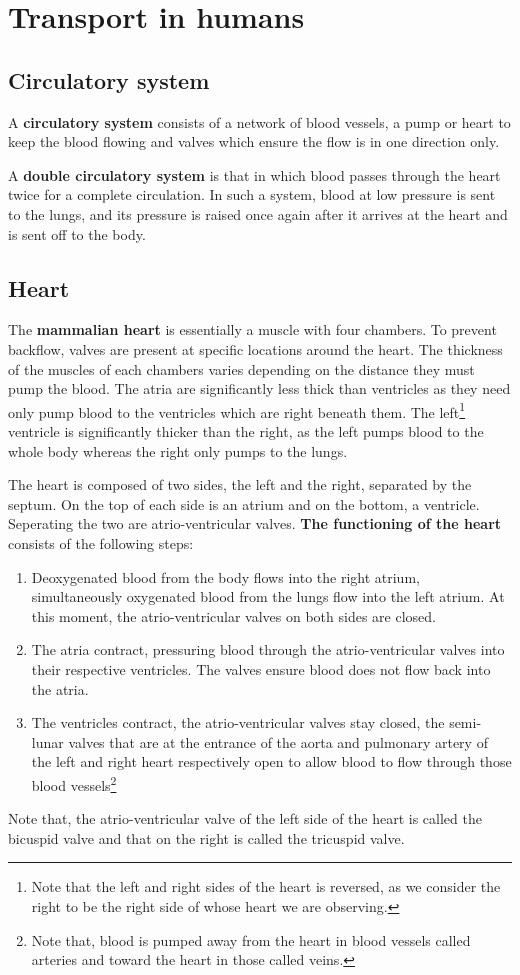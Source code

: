 \section{Transport in humans}
\subsection{Circulatory system}

A \textbf{circulatory system} consists of a network of blood vessels, a pump or heart to keep the
blood flowing and valves which ensure the flow is in one direction only.

A \textbf{double circulatory system} is that in which blood passes through the heart twice for
a complete circulation. In such a system, blood at low pressure is sent to the lungs, and its
pressure is raised once again after it arrives at the heart and is sent off to the body.

\subsection{Heart}
The \textbf{mammalian heart} is essentially a muscle with four chambers. To prevent backflow,
valves are present at specific locations around the heart. 
The thickness of the muscles of each chambers varies depending on the distance they must pump
the blood. The atria are significantly less thick than ventricles as they need only pump blood to 
the ventricles which are right beneath them. 
The left\footnote{Note that the left and right sides of the heart is reversed, as we
consider the right to be the right side of whose heart we are observing.} ventricle is 
significantly thicker than the right, as the left pumps blood to the whole body whereas the right
only pumps to the lungs.

The heart is composed of two sides, the left and the right, separated by the septum. On the top of 
each side is an atrium
and on the bottom, a ventricle. Seperating the two are atrio-ventricular valves.
\textbf{The functioning of the heart} consists of the following steps:
\begin{enumerate}
	\item Deoxygenated blood from the body flows into the right atrium, simultaneously oxygenated
		blood from the lungs flow into the left atrium. At this moment, the atrio-ventricular
		valves on both sides are closed.
	\item The atria contract, pressuring blood through the atrio-ventricular valves into their
		respective ventricles. The valves ensure blood does not flow back into the atria.
	\item The ventricles contract, the atrio-ventricular valves stay closed, the semi-lunar valves
		that are at the entrance of the aorta and pulmonary artery of the left and right heart
		respectively open to allow blood to flow through those blood vessels\footnote{
		Note that, blood is pumped away from the heart in blood vessels called arteries and toward the 
		heart in those called veins.}
\end{enumerate}
Note that, the atrio-ventricular valve of the left side of the heart is called the bicuspid valve
and that on the right is called the tricuspid valve.


